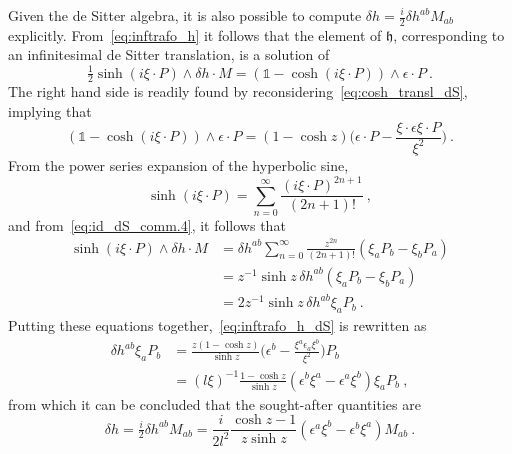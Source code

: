 \documentclass[11pt]{article}
\begin{document}
\blankline
Given the de Sitter algebra, it is also possible to compute 
$\delta h = \tfrac{i}{2} \delta h^{ab} M_{ab}$ explicitly.  
From~\eqref{eq:inftrafo_h} it follows that the element of 
$\mathfrak{h}$, corresponding to an infinitesimal de Sitter 
translation, is a solution of
%
\begin{equation}\label{eq:inftrafo_h_dS}
	\tfrac{1}{2} \sinh(i\xi\cdot P) \wedge \delta h \cdot M = 
	(\mathds{1}-\cosh(i\xi\cdot P)) \wedge \epsilon\cdot P~.
\end{equation}
The right hand side is readily found by 
reconsidering~\eqref{eq:cosh_transl_dS}, implying that
%
\begin{displaymath}
	(\mathds{1} - \cosh(i\xi\cdot P)) \wedge \epsilon\cdot P
	= (1 - \cosh z)\bigg(\epsilon\cdot P - \frac{\xi\cdot\epsilon 
		\xi\cdot P}{\xi^2}\bigg)~.
\end{displaymath}
From the power series expansion of the hyperbolic sine,
%
\begin{displaymath}
	\sinh(i\xi\cdot P) = \sum_{n=0}^\infty \frac{(i\xi\cdot 
		P)^{2n+1}}{(2n+1)!}~,
\end{displaymath}
and from~\eqref{eq:id_dS_comm.4}, it follows that
%
\begin{displaymath}
\begin{split}
	\sinh(i\xi\cdot P) \wedge \delta h \cdot M
	&= \delta h^{ab} \sum_{n=0}^\infty \frac{z^{2n}}{(2n+1)!} 
	(\xi_a P_b - \xi_b P_a ) \\
	&= z^{-1} \sinh z\, \delta h^{ab} (\xi_a P_b - \xi_b P_a ) \\
	&= 2 z^{-1} \sinh z\, \delta h^{ab} \xi_a P_b~.
\end{split}
\end{displaymath}
Putting these equations together,~\eqref{eq:inftrafo_h_dS} is 
rewritten as
%
\begin{displaymath}
\begin{split}
	\delta h^{ab} \xi_a P_b &= \frac{z (1-\cosh z)}{\sinh z} 
	\bigg(\epsilon^b - \frac{\xi^a \epsilon_ a \xi^b}{\xi^2} 
	\bigg)P_b \\
	&= (l\xi)^{-1} \frac{1-\cosh z}{\sinh z} (\epsilon^b\xi^a - 
	\epsilon^a\xi^b) \xi_a P_b~,
\end{split}
\end{displaymath}
from which it can be concluded that the sought-after quantities 
are
\begin{equation}
	\delta h = \tfrac{i}{2}\delta h^{ab} M_{ab} = \frac{i}{2l^2} 
	\frac{\cosh z - 1}{z\sinh z} (\epsilon^a\xi^b - 
	\epsilon^b\xi^a) M_{ab}~.
\end{equation}
\end{document}
